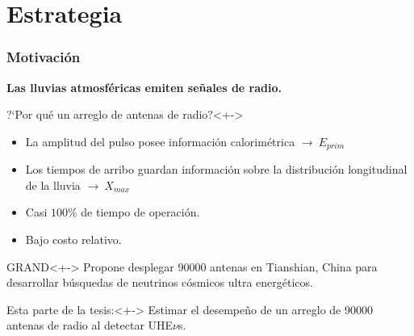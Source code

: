 \section{Estrategia}

\begin{frame}
 \frametitle{Motivaci\'on}
 \footnotesize
 \begin{exampleblock}{}
  \centering
  \textbf{Las lluvias atmosf\'ericas emiten se\~nales de radio.}
 \end{exampleblock}

 
 \begin{block}{?`Por qu\'e un arreglo de antenas de radio?}<+->
  \begin{itemize}\setlength\itemsep{2mm}
   \item La amplitud del pulso posee informaci\'on calorim\'etrica $\rightarrow\ E_{prim}$
   \item Los tiempos de arribo guardan informaci\'on sobre la distribuci\'on longitudinal de la lluvia $\rightarrow\ X_{max}$
   \item Casi $100\%$ de tiempo de operaci\'on.
   \item Bajo costo relativo.
  \end{itemize}
 \end{block}
 
 \begin{exampleblock}{GRAND}<+->
  Propone desplegar 90000 antenas en Tianshian, China para desarrollar b\'usquedas de neutrinos c\'osmicos ultra energ\'eticos.
 \end{exampleblock}
 
 \begin{alertblock}{Esta parte de la tesis:}<+->
  Estimar el desempe\~no de un arreglo de 90000 antenas de radio al detectar UHE$\nu$s.
 \end{alertblock}
 
\end{frame}
